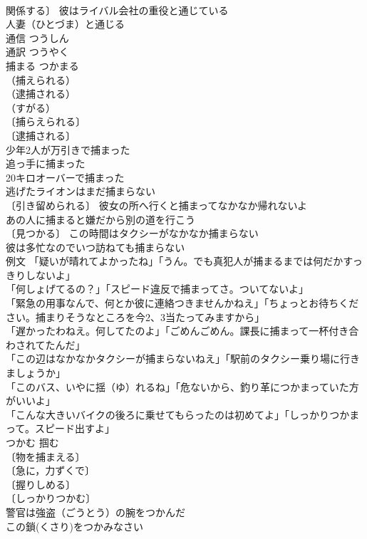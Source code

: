\documentclass[8pt]{extreport}
\begin{document}
\begin{CJK}{UTF8}{min}
\\	関係する〕 彼はライバル会社の重役と通じている 
\\	人妻（ひとづま）と通じる 
\\	通信	つうしん	
\\	通訳	つうやく	
\\	捕まる	つかまる	
\\	（捕えられる）
\\	（逮捕される）
\\	（すがる）
\\	〔捕らえられる〕
\\	〔逮捕される〕
\\	少年2人が万引きで捕まった 
\\	追っ手に捕まった 
\\	20キロオーバーで捕まった 
\\	逃げたライオンはまだ捕まらない 
\\	〔引き留められる〕 彼女の所へ行くと捕まってなかなか帰れないよ 
\\	あの人に捕まると嫌だから別の道を行こう 
\\	〔見つかる〕 この時間はタクシーがなかなか捕まらない 
\\	彼は多忙なのでいつ訪ねても捕まらない 
\\	例文 「疑いが晴れてよかったね」「うん。でも真犯人が捕まるまでは何だかすっきりしないよ」 
\\	「何しょげてるの？」「スピード違反で捕まってさ。ついてないよ」 
\\	「緊急の用事なんで、何とか彼に連絡つきませんかねえ」「ちょっとお待ちください。捕まりそうなところを今2、3当たってみますから」 
\\	「遅かったわねえ。何してたのよ」「ごめんごめん。課長に捕まって一杯付き合わされてたんだ」 
\\	「この辺はなかなかタクシーが捕まらないねえ」「駅前のタクシー乗り場に行きましょうか」 
\\	「このバス、いやに揺（ゆ）れるね」「危ないから、釣り革につかまっていた方がいいよ」 
\\	「こんな大きいバイクの後ろに乗せてもらったのは初めてよ」「しっかりつかまって。スピード出すよ」 
\\	つかむ	掴む	
\\	〔物を捕まえる〕
\\	〔急に，力ずくで〕
\\	〔握りしめる〕
\\	〔しっかりつかむ〕
\\	警官は強盗（ごうとう）の腕をつかんだ 
\\	この鎖(くさり)をつかみなさい 

\end{CJK}
\end{document}
